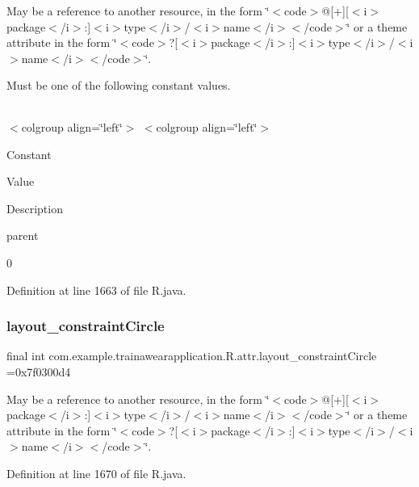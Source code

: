 May be a reference to another resource, in the form \char`\"{}$<$code$>$@\mbox{[}+\mbox{]}\mbox{[}$<$i$>$package$<$/i$>$\+:\mbox{]}$<$i$>$type$<$/i$>$/$<$i$>$name$<$/i$>$$<$/code$>$\char`\"{} or a theme attribute in the form \char`\"{}$<$code$>$?\mbox{[}$<$i$>$package$<$/i$>$\+:\mbox{]}$<$i$>$type$<$/i$>$/$<$i$>$name$<$/i$>$$<$/code$>$\char`\"{}. 

Must be one of the following constant values.

\tabulinesep=1mm
\begin{longtabu}spread 0pt [c]{*{0}{|X[-1]}|}
\hline
\end{longtabu}
$<$colgroup align=\char`\"{}left\char`\"{}$>$ $<$colgroup align=\char`\"{}left\char`\"{}$>$ 

Constant

Value

Description 

parent

0

Definition at line 1663 of file R.\+java.

\mbox{\label{classcom_1_1example_1_1trainawearapplication_1_1_r_1_1attr_a2d0fc0da56776452dd131901500e1063}} 
\subsubsection{\texorpdfstring{layout\_constraintCircle}{layout\_constraintCircle}}
{\footnotesize\ttfamily final int com.\+example.\+trainawearapplication.\+R.\+attr.\+layout\+\_\+constraint\+Circle =0x7f0300d4\hspace{0.3cm}{\ttfamily [static]}}

May be a reference to another resource, in the form \char`\"{}$<$code$>$@\mbox{[}+\mbox{]}\mbox{[}$<$i$>$package$<$/i$>$\+:\mbox{]}$<$i$>$type$<$/i$>$/$<$i$>$name$<$/i$>$$<$/code$>$\char`\"{} or a theme attribute in the form \char`\"{}$<$code$>$?\mbox{[}$<$i$>$package$<$/i$>$\+:\mbox{]}$<$i$>$type$<$/i$>$/$<$i$>$name$<$/i$>$$<$/code$>$\char`\"{}. 

Definition at line 1670 of file R.\+java.

\mbox{\label{classcom_1_1example_1_1trainawearapplication_1_1_r_1_1attr_a6718a0d93dbb6259ed8c9e49c0c62631}} 
